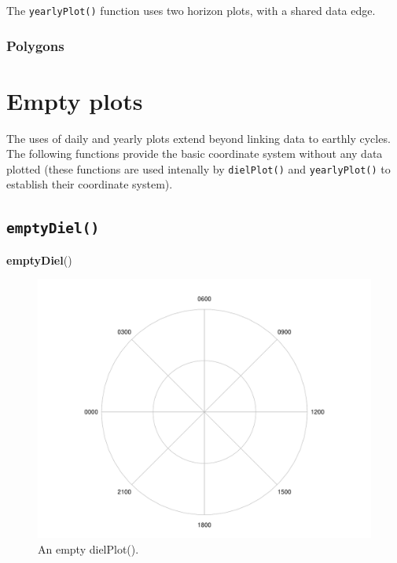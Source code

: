 \documentclass[
]{book}
\newenvironment{Shaded}{\begin{snugshade}}{\end{snugshade}}
\newcommand{\FunctionTok}[1]{\textcolor[rgb]{0.13,0.29,0.53}{\textbf{#1}}}
\newcommand{\NormalTok}[1]{#1}
\begin{document}
The \texttt{yearlyPlot()} function uses two horizon plots, with a shared data edge.

\hypertarget{polygons}{%
\subsubsection{Polygons}\label{polygons}}

\hypertarget{empty-plots}{%
\section{Empty plots}\label{empty-plots}}

The uses of daily and yearly plots extend beyond linking data to earthly cycles. The following functions provide the basic coordinate system without any data plotted (these functions are used intenally by \texttt{dielPlot()} and \texttt{yearlyPlot()} to establish their coordinate system).

\hypertarget{emptydiel}{%
\subsection{\texorpdfstring{\texttt{emptyDiel()}}{emptyDiel()}}\label{emptydiel}}

\begin{Shaded}
\begin{Highlighting}[]
\FunctionTok{emptyDiel}\NormalTok{()}
\end{Highlighting}
\end{Shaded}

\begin{figure}

{\centering \includegraphics[width=0.9\linewidth]{_main_files/figure-latex/emptyDiel-1} 

}

\caption{An empty dielPlot().}\label{fig:emptyDiel}
\end{figure}
\end{document}
